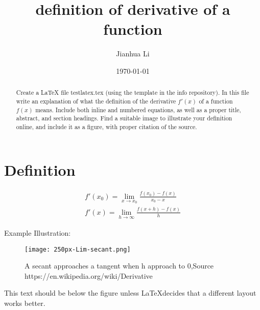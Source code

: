 \documentclass{article}
\begin{document}
 
\title{definition of derivative of a function }
\author{Jianhua Li}
\date{\today}

\maketitle

\begin{abstract}
Create a LaTeX file testlatex.tex (using the template in the info repository). In this file write an explanation of what the definition of the derivative $f'(x)$ of a function $f(x)$ means. Include both inline and numbered equations, as well as a proper title, abstract, and section headings. Find a suitable image to illustrate your definition online, and include it as a figure, with proper citation of the source.
\end{abstract}




\section{Definition}

\begin{align}
  f'(x_0) = \lim_{x\to x_0} \frac{f(x_0)-f(x)}{x_0-x}\\
  f'(x) = \lim_{h\to\infty} \frac{f(x+h)-f(x)}{h} %
\end{align}



Example Illustration:


\begin{figure}[h!] %
  \texttt{[image: 250px-Lim-secant.png]}  %
  \caption{A secant approaches a tangent when h approach to 0,Source https://en.wikipedia.org/wiki/Derivative}
  \label{fig:tangent}
\end{figure}

This text should be below the figure unless \LaTeX  decides that a different layout works better.
 
 
\end{document}
